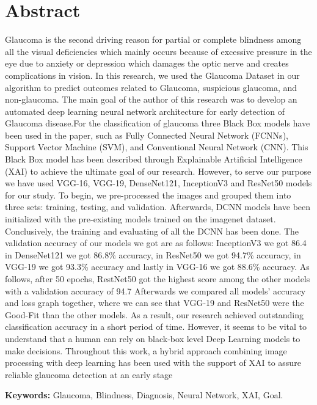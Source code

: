 \section*{Abstract}
Glaucoma is the second driving reason for partial or complete blindness among all the visual
deficiencies which mainly occurs because of excessive pressure in the eye due to anxiety or
depression which damages the optic nerve and creates complications in vision. In this
research, we used the Glaucoma Dataset in our algorithm to predict outcomes related to
Glaucoma, suspicious glaucoma, and non-glaucoma. The main goal of the author of this
research was to develop an automated deep learning neural network architecture for early
detection of Glaucoma disease.For the classification of glaucoma three Black Box models
have been used in the paper, such as Fully Connected Neural Network (FCNNs), Support
Vector Machine (SVM), and Conventional Neural Network (CNN). This Black Box model has
been described through Explainable Artificial Intelligence (XAI) to achieve the ultimate goal
of our research. However, to serve our purpose we have used VGG-16, VGG-19,
DenseNet121, InceptionV3 and ResNet50 models for our study. To begin, we pre-processed
the images and grouped them into three sets: training, testing, and validation. Afterwards,
DCNN models have been initialized with the pre-existing models trained on the imagenet
dataset. Conclusively, the training and evaluating of all the DCNN has been done. The
validation accuracy of our models we got are as follows: InceptionV3 we got 86.4%
in DenseNet121 we got 86.8\% accuracy, in ResNet50 we got 94.7\% accuracy, in VGG-19 we
got 93.3\% accuracy and lastly in VGG-16 we got 88.6\% accuracy. As follows, after 50 epochs,
RestNet50 got the highest score among the other models with a validation accuracy of 94.7%
Afterwards we compared all models' accuracy and loss graph together, where we can see that
VGG-19 and ResNet50 were the Good-Fit than the other models. As a result, our research
achieved outstanding classification accuracy in a short period of time. However, it seems to be
vital to understand that a human can rely on black-box level Deep Learning models to make
decisions. Throughout this work, a hybrid approach combining image processing with deep
learning has been used with the support of XAI to assure reliable glaucoma detection at an
early stage

\vspace{1cm}
\textbf{Keywords:} Glaucoma, Blindness, Diagnosis, Neural Network, XAI, Goal.
\pagebreak

